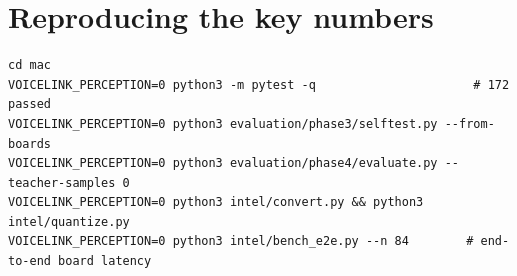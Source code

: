 \documentclass[11pt]{article}
\begin{document}
\section{Reproducing the key numbers}
\begin{lstlisting}
cd mac
VOICELINK_PERCEPTION=0 python3 -m pytest -q                      # 172 passed
VOICELINK_PERCEPTION=0 python3 evaluation/phase3/selftest.py --from-boards
VOICELINK_PERCEPTION=0 python3 evaluation/phase4/evaluate.py --teacher-samples 0
VOICELINK_PERCEPTION=0 python3 intel/convert.py && python3 intel/quantize.py
VOICELINK_PERCEPTION=0 python3 intel/bench_e2e.py --n 84        # end-to-end board latency
\end{lstlisting}
\end{document}
